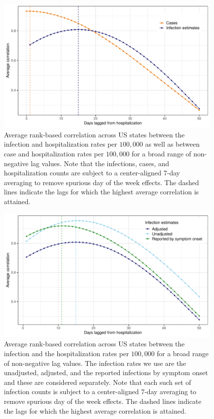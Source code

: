 \documentclass{article}
\begin{document}
\begin{figure}[!tb]
\centering
    \includegraphics[width=.9\textwidth]{infect_case_hosp_lag_corr.pdf} 
    \caption{Average rank-based correlation across US states between the infection and 
    hospitalization rates per $100,000$ as well as between case and 
    hospitalization rates per $100,000$ for a broad range of non-negative
     lag values. Note that the infections, cases, and hospitalization counts are subject 
     to a center-aligned 7-day averaging to remove spurious day of the week effects. 
     The dashed lines indicate the lags for which the highest average correlation is attained.}
    \label{fig:infect_case_hosp_lag_corr}
\end{figure}

\begin{figure}[!tb]
\centering
    \includegraphics[width=.9\textwidth]{adj_unadj_sym_hosp_lag_corr.pdf} 
    \caption{Average rank-based correlation across US states between the infection 
    and the hospitalization rates per $100,000$ for a broad range of non-negative lag values. 
    The infection rates we use are the unadjusted, adjusted, and the reported infections 
    by symptom onset and these are considered separately. Note that each such set of infection counts 
    is subject to a center-aligned 7-day averaging to remove spurious day of the week effects. 
     The dashed lines indicate the lags for which the highest average correlation is attained.}
    \label{fig:adj_unadj_sym_hosp_lag_corr}
\end{figure}
\end{document}
